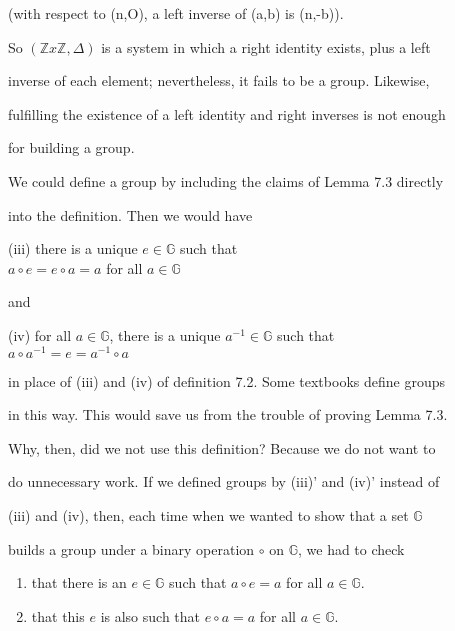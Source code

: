 \documentclass[11pt]{amsbook}
\begin{document}
(with respect to (n,O), a left inverse of (a,b) is (n,-b)).\par

So $(\mathbb{Z}x\mathbb{Z},\Delta)$ is a system in which a right identity exists, plus a left\par
inverse of each element; nevertheless, it fails to be a group. Likewise,\par
fulfilling the existence of a left identity and right inverses is not enough\par
for building a group.\par

We could define a group by including the claims of Lemma 7.3 directly\par
into the definition. Then we would have\par

\begin{center}

    (iii) there is a unique $e\in\mathbb{G}$ such that\\
    $a\circ e=e\circ a=a$ for all $a\in\mathbb{G}$

\end{center}

and

\begin{center}

    (iv) for all $a\in\mathbb{G}$, there is a unique $a^{-1}\in\mathbb{G}$ such that\\
    $a\circ a^{-1}=e=a^{-1} \circ a$

\end{center}

in place of (iii) and (iv) of definition 7.2. Some textbooks define groups\par
in this way. This would save us from the trouble of proving Lemma 7.3.\par
Why, then, did we not use this definition? Because we do not want to\par
do unnecessary work. If we defined groups by (iii)' and (iv)' instead of\par
(iii) and (iv), then, each time when we wanted to show that a set $\mathbb{G}$\par
builds a group under a binary operation $\circ$ on $\mathbb{G}$, we had to check

\begin{center}

    \begin{enumerate}
        \item that there is an $e\in\mathbb{G}$ such that $a\circ e=a$ for all $a\in\mathbb{G}$. 
        \item that this $e$ is also such that $e\circ a=a$ for all $a\in\mathbb{G}$.
    \end{enumerate}

\end{center}



\end{document}
